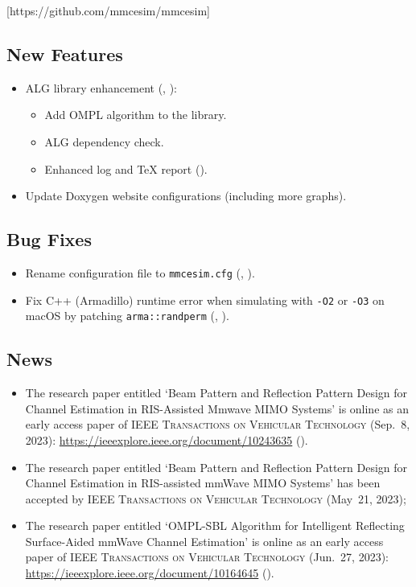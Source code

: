 [https://github.com/mmcesim/mmcesim]
\subsection*{New Features}
\begin{itemize}
  \item ALG library enhancement (, ):
  \begin{itemize}
    \item Add OMPL \cite{zhao2023ompl} algorithm to the library.
    \item ALG dependency check.
    \item Enhanced log and \TeX{} report ().
  \end{itemize}
  \item Update Doxygen website configurations (including more graphs).
\end{itemize}
\subsection*{Bug Fixes}
\begin{itemize}
  \item Rename configuration file to \texttt{mmcesim.cfg} (, ).
  \item Fix C++ (Armadillo) runtime error when simulating with \texttt{-O2} or \texttt{-O3} on macOS by patching \texttt{arma::randperm} (, ).
\end{itemize}
\subsection*{News}
\begin{itemize}
  \item The research paper entitled `Beam Pattern and Reflection Pattern Design for Channel Estimation in RIS-Assisted Mmwave MIMO Systems' \cite{you2023beam} is online as an early access paper of \textsc{IEEE Transactions on Vehicular Technology} (Sep.~8, 2023): \url{https://ieeexplore.ieee.org/document/10243635} ().
  \item The research paper entitled `Beam Pattern and Reflection Pattern Design for Channel Estimation in RIS-assisted mmWave MIMO Systems' \cite{you2023beam} has been accepted by \textsc{IEEE Transactions on Vehicular Technology} (May~21, 2023);
  \item The research paper entitled `OMPL-SBL Algorithm for Intelligent Reflecting Surface-Aided mmWave Channel Estimation' \cite{zhao2023ompl} is online as an early access paper of \textsc{IEEE Transactions on Vehicular Technology} (Jun.~27, 2023): \url{https://ieeexplore.ieee.org/document/10164645} ().
\end{itemize}

